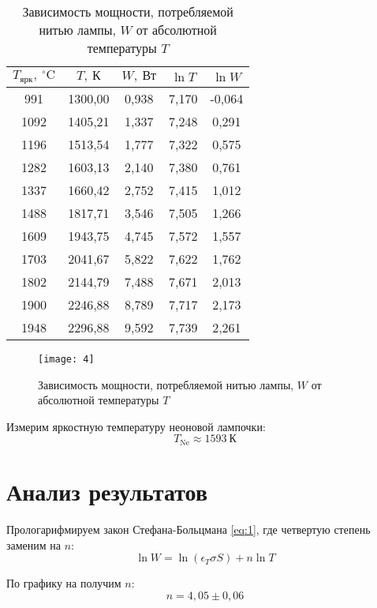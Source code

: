 \documentclass[a4paper, 12pt]{article}
\begin{document}
\renewcommand{\arraystretch}{1.5}
\begin{table}[H]
\centering
\begin{tabular}{|c|c|c|c|c|}
\hline
$T_\text{ярк},\: ^{\circ}\text{C}$    & $T,\: \text{К}$
& $W,\: \text{Вт}$     & $\ln T$   & $\ln W$    \\ \hline
991  & 1300,00 & 0,938 & 7,170 & -0,064 \\ \hline
1092 & 1405,21 & 1,337 & 7,248 & 0,291  \\ \hline
1196 & 1513,54 & 1,777 & 7,322 & 0,575  \\ \hline
1282 & 1603,13 & 2,140 & 7,380 & 0,761  \\ \hline
1337 & 1660,42 & 2,752 & 7,415 & 1,012  \\ \hline
1488 & 1817,71 & 3,546 & 7,505 & 1,266  \\ \hline
1609 & 1943,75 & 4,745 & 7,572 & 1,557  \\ \hline
1703 & 2041,67 & 5,822 & 7,622 & 1,762  \\ \hline
1802 & 2144,79 & 7,488 & 7,671 & 2,013  \\ \hline
1900 & 2246,88 & 8,789 & 7,717 & 2,173  \\ \hline
1948 & 2296,88 & 9,592 & 7,739 & 2,261  \\ \hline
\end{tabular}
\caption{Зависимость мощности, потребляемой нитью лампы, $W$ от
абсолютной температуры $T$}
\end{table}


\begin{figure}[H]
    \texttt{[image: 4]} 
    \caption{Зависимость мощности, потребляемой нитью лампы, $W$ от
абсолютной температуры $T$}
\label{fig:4}
\end{figure}




Измерим яркостную температуру неоновой лампочки:
\[
    T_\text{Ne} \approx 1593\: \text{К} 
\]






\section{Анализ результатов}
Прологарифмируем закон Стефана-Больцмана \eqref{eq:1}, где четвертую степень
заменим на $n$:
\[
    \ln W = \ln (\epsilon_T \sigma S) + n \ln T
\]

По графику на  получим $n$:
\[
    n = 4,05 \pm 0,06
\]
\end{document}
